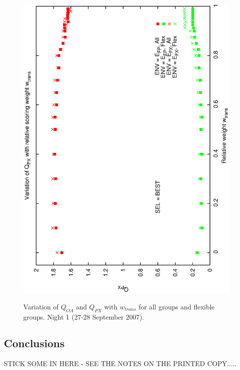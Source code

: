 \begin{figure}[h]
\begin{center}
{    \includegraphics[scale=0.5, angle=-90]{figures/cs1_dw1_px_c.eps}
    \label{fig:cs1_dw1_px_c}
  }
 \caption{Variation of $Q_{OA}$ and $Q_{PX}$ with $w_{trans}$  for all groups and flexible groups. Night 1 (27-28 September 2007).}
\end{center}
\end{figure}

\subsection{Conclusions}
STICK SOME IN HERE - SEE THE NOTES ON THE PRINTED COPY.....
